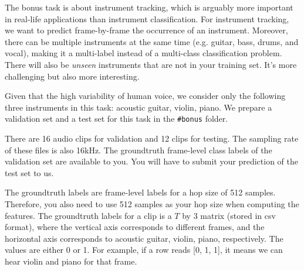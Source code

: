 \documentclass[twoside,a4paper]{refart}
\begin{document}
The bonus task is about instrument tracking, which is arguably more important in real-life applications than instrument classification. For instrument tracking, we want to predict frame-by-frame the occurrence of an instrument. Moreover, there can be multiple instruments at the same time (e.g. guitar, bass, drums, and vocal), making it a multi-label instead of a multi-class classification problem. There will also be \emph{unseen} instruments that are not in your training set. It's more challenging but also more interesting.

Given that the high variability of human voice, we consider only the following three instruments in this task: acoustic guitar, violin, piano. We prepare a validation set and a test set for this task in the \texttt{\#bonus} folder.

There are 16 audio clips for validation and 12 clips for testing. The sampling rate of these files is also 16kHz. The groundtruth frame-level class labels of the validation set are available to you. You will have to submit your prediction of the test set to us.

The groundtruth labels are frame-level labels for a hop size of 512 samples. Therefore, you also need to use 512 samples as your hop size when computing the features. The groundtruth labels for a clip is a $T$ by 3 matrix (stored in csv format), where the vertical axis corresponds to different frames, and the horizontal axis corresponds to acoustic guitar, violin, piano, respectively. The values are either 0 or 1. For example, if a row reads [0, 1, 1], it means we can hear violin and piano for that frame.
\end{document}
